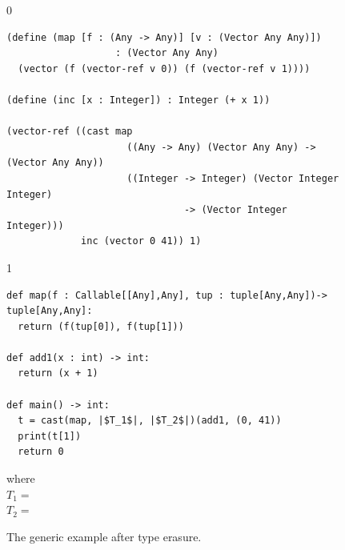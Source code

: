 \documentclass[7x10]{TimesAPriori_MIT}%
\def\racketEd{0}
\def\pythonEd{1}
\providecommand{\BookEdition}{1}
\let\edition\BookEdition
\newcommand{\pythonColor}[0]{}
\numberwithin{theorem}{chapter}
\numberwithin{definition}{chapter}
\numberwithin{equation}{chapter}
\begin{document}
\begin{figure}[tbp]
\begin{tcolorbox}[colback=white]  
{\if\edition\racketEd    
\begin{lstlisting}
(define (map [f : (Any -> Any)] [v : (Vector Any Any)])
                   : (Vector Any Any)
  (vector (f (vector-ref v 0)) (f (vector-ref v 1))))

(define (inc [x : Integer]) : Integer (+ x 1))

(vector-ref ((cast map
                     ((Any -> Any) (Vector Any Any) -> (Vector Any Any))  
                     ((Integer -> Integer) (Vector Integer Integer)
                               -> (Vector Integer Integer)))
             inc (vector 0 41)) 1)
\end{lstlisting}
\fi}
{\if\edition\pythonEd\pythonColor
\begin{lstlisting}
def map(f : Callable[[Any],Any], tup : tuple[Any,Any])-> tuple[Any,Any]:
  return (f(tup[0]), f(tup[1]))

def add1(x : int) -> int:
  return (x + 1)

def main() -> int:
  t = cast(map, |$T_1$|, |$T_2$|)(add1, (0, 41))
  print(t[1])
  return 0
\end{lstlisting}
{\small
where\\
$T_1 = $ \\
$T_2 = $ 
}
\fi}
\end{tcolorbox}

\caption{The generic  example after type erasure.}
\label{fig:map-erase}
\end{figure}
\end{document}
